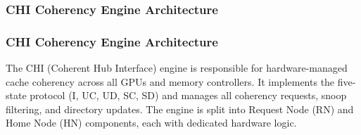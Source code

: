 \documentclass[11pt,a4paper]{article}
\begin{document}
\subsubsection{CHI Coherency Engine Architecture}

\subsubsection{CHI Coherency Engine Architecture}

The CHI (Coherent Hub Interface) engine is responsible for hardware-managed cache coherency across all GPUs and memory controllers. It implements the five-state protocol (I, UC, UD, SC, SD) and manages all coherency requests, snoop filtering, and directory updates. The engine is split into Request Node (RN) and Home Node (HN) components, each with dedicated hardware logic.
\end{document}
